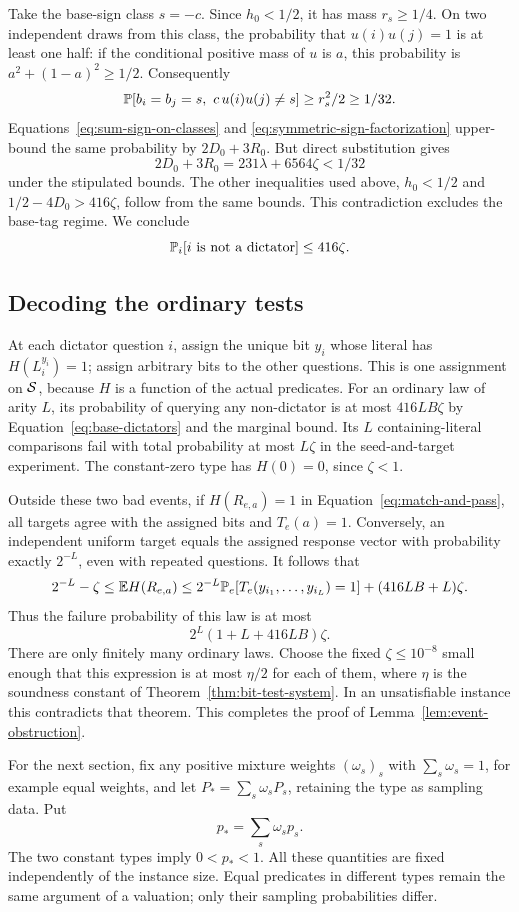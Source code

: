 Take the base-sign class $s=-c$. Since $h_0<1/2$, it has mass
$r_s\geq1/4$. On two independent draws from this class, the
probability that $u(i)u(j)=1$ is at least one half: if the conditional
positive mass of $u$ is $a$, this probability is
$a^2+(1-a)^2\geq1/2$.
Consequently
\[
 \Prob[b_i=b_j=s,\ c\,u(i)u(j)\ne s]\geq r_s^2/2\geq1/32.
\]
Equations~\ref{eq:sum-sign-on-classes} and
\ref{eq:symmetric-sign-factorization} upper-bound the same
probability by $2D_0+3R_0$. But direct substitution gives
\[
 2D_0+3R_0=231\lambda+6564\zeta<1/32
\]
under the stipulated bounds. The other inequalities used above,
$h_0<1/2$ and $1/2-4D_0>416\zeta$, follow from the same bounds.
This contradiction excludes the base-tag regime. We conclude
\begin{equation}\label{eq:base-dictators}
 \mathbb P_i[i\text{ is not a dictator}]\leq416\zeta.
\end{equation}

\subsection{Decoding the ordinary tests}

At each dictator question $i$, assign the unique bit $y_i$ whose
literal has $H(L_i^{y_i})=1$; assign arbitrary bits to the other
questions. This is one assignment on $\mathcal S$, because $H$ is a
function of the actual predicates.
For an ordinary law of arity $L$, its probability of querying any
non-dictator is at most $416LB\zeta$ by
Equation~\ref{eq:base-dictators} and the marginal bound.
Its $L$ containing-literal comparisons fail with total probability
at most $L\zeta$ in the seed-and-target experiment.
The constant-zero type has $H(0)=0$, since $\zeta<1$.

Outside these two bad events, if $H(R_{e,a})=1$ in
Equation~\ref{eq:match-and-pass}, all targets agree with the assigned
bits and $T_e(a)=1$. Conversely, an independent uniform target
equals the assigned response vector with probability exactly
$2^{-L}$, even with repeated questions. It follows that
\[
 2^{-L}-\zeta
 \leq \mathbb E H(R_{e,a})
 \leq 2^{-L}\mathbb P_e[T_e(y_{i_1},\ldots,y_{i_L})=1]
       +(416LB+L)\zeta.
\]
Thus the failure probability of this law is at most
\[
 2^L(1+L+416LB)\zeta.
\]
There are only finitely many ordinary laws. Choose the fixed
$\zeta\leq10^{-8}$ small enough that this expression is at most
$\eta/2$ for each of them, where $\eta$ is the soundness constant
of Theorem~\ref{thm:bit-test-system}. In an unsatisfiable instance
this contradicts that theorem. This completes the proof of
Lemma~\ref{lem:event-obstruction}.

For the next section, fix any positive mixture weights
$(\omega_s)_s$ with $\sum_s\omega_s=1$, for example equal weights,
and let $P_*=\sum_s\omega_sP_s$, retaining the type as sampling
data. Put
\begin{equation}\label{eq:primitive-mixture}
 p_*=\sum_s\omega_sp_s.
\end{equation}
The two constant types imply $0<p_*<1$. All these quantities are
fixed independently of the instance size. Equal predicates in
different types remain the same argument of a valuation; only
their sampling probabilities differ.
